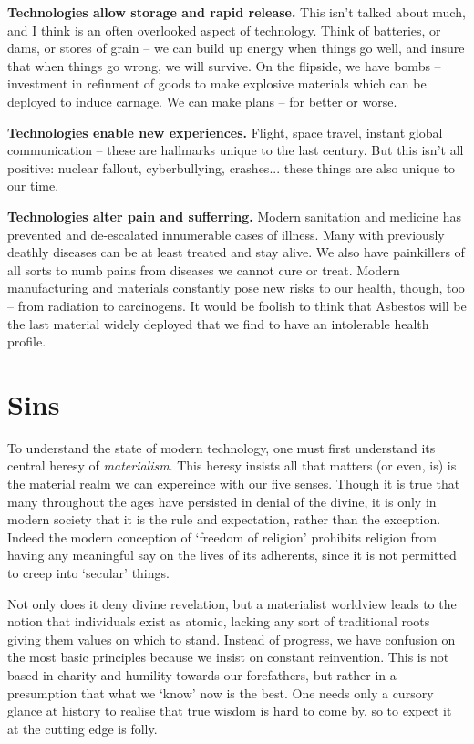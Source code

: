 \documentclass[letterpaper]{article}
\begin{document}
  \textbf{Technologies allow storage and rapid release.} This isn't talked about much, and I think is an often overlooked aspect of technology. Think of batteries, or dams, or stores of grain -- we can build up energy when things go well, and insure that when things go wrong, we will survive. On the flipside, we have bombs -- investment in refinment of goods to make explosive materials which can be deployed to induce carnage. We can make plans -- for better or worse.

  \textbf{Technologies enable new experiences.} Flight, space travel, instant global communication -- these are hallmarks unique to the last century. But this isn't all positive: nuclear fallout, cyberbullying, crashes... these things are also unique to our time.

  \textbf{Technologies alter pain and sufferring.} Modern sanitation and medicine has prevented and de-escalated innumerable cases of illness. Many with previously deathly diseases can be at least treated and stay alive. We also have painkillers of all sorts to numb pains from diseases we cannot cure or treat. Modern manufacturing and materials constantly pose new risks to our health, though, too -- from radiation to carcinogens. It would be foolish to think that Asbestos will be the last material widely deployed that we find to have an intolerable health profile.


\section{Sins}

  To understand the state of modern technology, one must first understand its central heresy of \textit{materialism}. This heresy insists all that matters (or even, is) is the material realm we can expereince with our five senses. Though it is true that many throughout the ages have persisted in denial of the divine, it is only in modern society that it is the rule and expectation, rather than the exception. Indeed the modern conception of `freedom of religion' prohibits religion from having any meaningful say on the lives of its adherents, since it is not permitted to creep into `secular' things.

  Not only does it deny divine revelation, but a materialist worldview leads to the notion that individuals exist as atomic, lacking any sort of traditional roots giving them values on which to stand. Instead of progress, we have confusion on the most basic principles because we insist on constant reinvention. This is not based in charity and humility towards our forefathers, but rather in a presumption that what we `know' now is the best. One needs only a cursory glance at history to realise that true wisdom is hard to come by, so to expect it at the cutting edge is folly.
\end{document}
